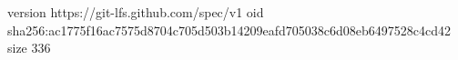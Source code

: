 version https://git-lfs.github.com/spec/v1
oid sha256:ac1775f16ac7575d8704c705d503b14209eafd705038c6d08eb6497528c4cd42
size 336
